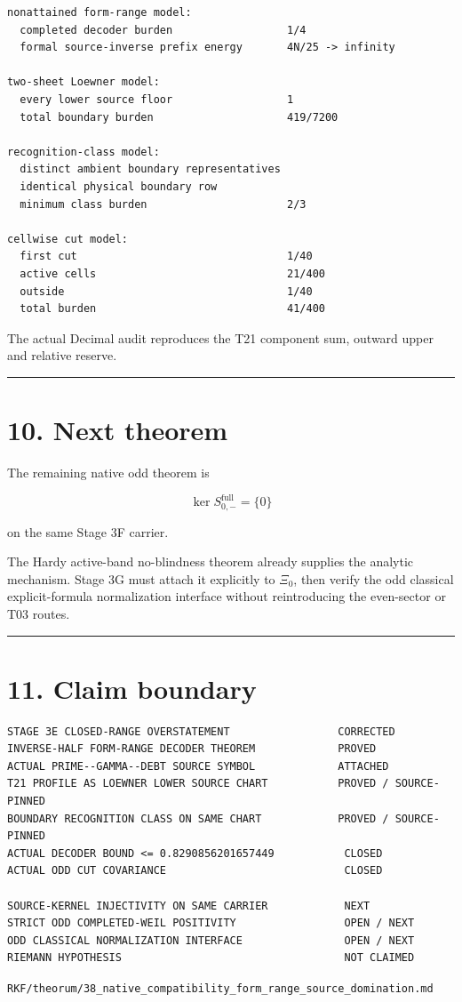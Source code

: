 \begin{verbatim}
nonattained form-range model:
  completed decoder burden                  1/4
  formal source-inverse prefix energy       4N/25 -> infinity

two-sheet Loewner model:
  every lower source floor                  1
  total boundary burden                     419/7200

recognition-class model:
  distinct ambient boundary representatives
  identical physical boundary row
  minimum class burden                      2/3

cellwise cut model:
  first cut                                 1/40
  active cells                              21/400
  outside                                   1/40
  total burden                              41/400
\end{verbatim}

The actual Decimal audit reproduces the T21 component sum, outward upper and
relative reserve.

\begin{center}\rule{0.5\linewidth}{0.5pt}\end{center}

\hypertarget{next-theorem}{%
\section{10. Next theorem}\label{next-theorem}}

The remaining native odd theorem is

\[
\boxed{
\ker S_{0,-}^{\mathrm{full}}=\{0\}
}
\]

on the same Stage 3F carrier.

The Hardy active-band no-blindness theorem already supplies the analytic
mechanism. Stage 3G must attach it explicitly to \(\Xi_0\), then verify the
odd classical explicit-formula normalization interface without reintroducing
the even-sector or T03 routes.

\begin{center}\rule{0.5\linewidth}{0.5pt}\end{center}

\hypertarget{claim-boundary}{%
\section{11. Claim boundary}\label{claim-boundary}}

\begin{verbatim}
STAGE 3E CLOSED-RANGE OVERSTATEMENT                 CORRECTED
INVERSE-HALF FORM-RANGE DECODER THEOREM             PROVED
ACTUAL PRIME--GAMMA--DEBT SOURCE SYMBOL             ATTACHED
T21 PROFILE AS LOEWNER LOWER SOURCE CHART           PROVED / SOURCE-PINNED
BOUNDARY RECOGNITION CLASS ON SAME CHART            PROVED / SOURCE-PINNED
ACTUAL DECODER BOUND <= 0.8290856201657449           CLOSED
ACTUAL ODD CUT COVARIANCE                            CLOSED

SOURCE-KERNEL INJECTIVITY ON SAME CARRIER            NEXT
STRICT ODD COMPLETED-WEIL POSITIVITY                 OPEN / NEXT
ODD CLASSICAL NORMALIZATION INTERFACE                OPEN / NEXT
RIEMANN HYPOTHESIS                                   NOT CLAIMED
\end{verbatim}

\begin{flushright}\small\texttt{RKF/theorum/38\_native\_compatibility\_form\_range\_source\_domination.md}\end{flushright}
